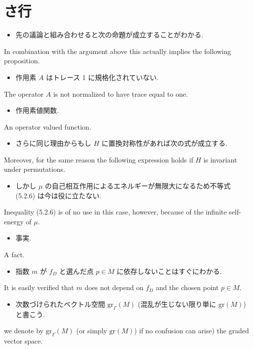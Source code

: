 \documentclass[openany, a4paper, oneside]{jsbook}
\begin{document}
\section{さ行}

\begin{itemize}
\item 先の議論と組み合わせると次の命題が成立することがわかる. \cite{LiebSeiringer1}
\end{itemize}
In combination with the argument above this actually implies the following proposition.

\begin{itemize}
\item 作用素 $A$ はトレース 1 に規格化されていない. \cite{LiebSeiringer1}
\end{itemize}
The operator $A$ is not normalized to have trace equal to one.

\begin{itemize}
\item 作用素値関数. \cite{LiebSeiringer1}
\end{itemize}
An operator valued function.

\begin{itemize}
\item さらに同じ理由からもし $H$ に置換対称性があれば次の式が成立する. \cite{LiebSeiringer1}
\end{itemize}
Moreover, for the same reason the following expression holds if $H$ is invariant under permutations.

\begin{itemize}
\item しかし $\mu$ の自己相互作用によるエネルギーが無限大になるため不等式 (5.2.6) は今は役に立たない. \cite{LiebSeiringer1}
\end{itemize}
Inequality (5.2.6) is of no use in this case, however, because of the infinite self-energy of $\mu$.

\begin{itemize}
\item 事実.
\end{itemize}
A fact.

\begin{itemize}
\item 指数 $m$ が $f_D$ と選んだ点 $p \in M$ に依存しないことはすぐにわかる.
\end{itemize}
It is easily verified that $m$ does not depend on $f_D$ and the chosen point $p \in M$.

\begin{itemize}
\item 次数づけられたベクトル空間 $\mathrm{gr}_{\Gamma} (M)$ (混乱が生じない限り単に $\mathrm{gr} (M)$) と書こう.
\end{itemize}
we denote by $\mathrm{gr}_{\Gamma} (M)$ (or simply $\mathrm{gr} (M)$) if no confusion can arise) the graded vector space.
\end{document}
